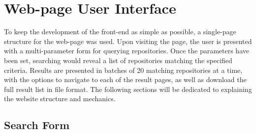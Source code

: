 \chapter{Web-page User Interface}\label{ch:5}

To keep the development of the front-end as simple as possible, a single-page structure for the web-page was used.
Upon visiting the page, the user is presented with a multi-parameter form for querying repositories.
Once the parameters have been set, searching would reveal a list of repositories matching the specified criteria.
Results are presented in batches of 20 matching repositories at a time, with the options to navigate to each of the result pages, as well as download the full result list in file format.
The following sections will be dedicated to explaining the website structure and mechanics.

\section{Search Form}

